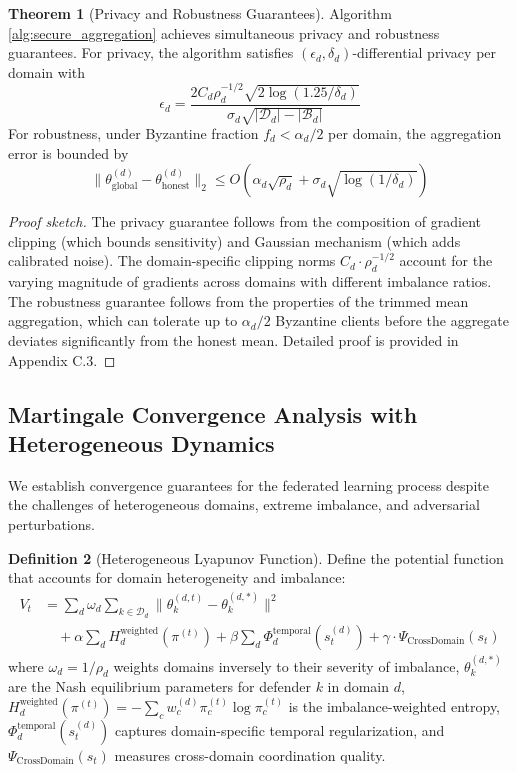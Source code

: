 \documentclass[12pt,a4paper]{article}
\theoremstyle{definition}
\newtheorem{theorem}{Theorem}[section]
\newtheorem{definition}[theorem]{Definition}
\newcommand{\D}{\mathcal{D}}
\newcommand{\B}{\mathcal{B}}
\begin{document}
\begin{theorem}[Privacy and Robustness Guarantees]
\label{thm:privacy_robustness}
Algorithm \ref{alg:secure_aggregation} achieves simultaneous privacy and robustness guarantees. For privacy, the algorithm satisfies $(\epsilon_d, \delta_d)$-differential privacy per domain with 
\begin{equation}
\epsilon_d = \frac{2C_d \rho_d^{-1/2} \sqrt{2\log(1.25/\delta_d)}}{\sigma_d\sqrt{|\D_d| - |\B_d|}}
\end{equation}
For robustness, under Byzantine fraction $f_d < \alpha_d/2$ per domain, the aggregation error is bounded by 
\begin{equation}
\|\theta_{\text{global}}^{(d)} - \theta_{\text{honest}}^{(d)}\|_2 \leq O\left(\alpha_d \sqrt{\rho_d} + \sigma_d \sqrt{\log(1/\delta_d)}\right)
\end{equation}
\end{theorem}

\begin{proof}[Proof sketch]
The privacy guarantee follows from the composition of gradient clipping (which bounds sensitivity) and Gaussian mechanism (which adds calibrated noise). The domain-specific clipping norms $C_d \cdot \rho_d^{-1/2}$ account for the varying magnitude of gradients across domains with different imbalance ratios. The robustness guarantee follows from the properties of the trimmed mean aggregation, which can tolerate up to $\alpha_d/2$ Byzantine clients before the aggregate deviates significantly from the honest mean. Detailed proof is provided in Appendix C.3.
\end{proof}

\subsection{Martingale Convergence Analysis with Heterogeneous Dynamics}

We establish convergence guarantees for the federated learning process despite the challenges of heterogeneous domains, extreme imbalance, and adversarial perturbations.

\begin{definition}[Heterogeneous Lyapunov Function]
\label{def:lyapunov_function}
Define the potential function that accounts for domain heterogeneity and imbalance:
\begin{align}
V_t &= \sum_{d} \omega_d \sum_{k \in \D_d} \|\theta_k^{(d,t)} - \theta_k^{(d,*)}\|^2 \label{eq:lyapunov} \\
&\quad + \alpha \sum_{d} H_d^{\text{weighted}}(\pi^{(t)}) + \beta \sum_{d} \Phi_d^{\text{temporal}}(s_t^{(d)}) + \gamma \cdot \Psi_{\text{CrossDomain}}(s_t) \nonumber
\end{align}
where $\omega_d = 1/\rho_d$ weights domains inversely to their severity of imbalance, $\theta_k^{(d,*)}$ are the Nash equilibrium parameters for defender $k$ in domain $d$, $H_d^{\text{weighted}}(\pi^{(t)}) = -\sum_c w_c^{(d)} \pi_c^{(t)} \log \pi_c^{(t)}$ is the imbalance-weighted entropy, $\Phi_d^{\text{temporal}}(s_t^{(d)})$ captures domain-specific temporal regularization, and $\Psi_{\text{CrossDomain}}(s_t)$ measures cross-domain coordination quality.
\end{definition}
\end{document}

